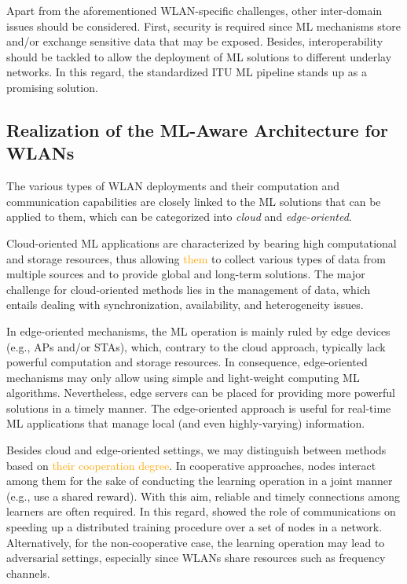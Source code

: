 \documentclass[journal]{IEEEtran}
\begin{document}
Apart from the aforementioned WLAN-specific challenges, other inter-domain issues should be considered. First, security is required since ML mechanisms store and/or exchange sensitive data that may be exposed. Besides, interoperability should be tackled to allow the deployment of ML solutions to different underlay networks. In this regard, the standardized ITU ML pipeline stands up as a promising solution.

\subsection{Realization of the ML-Aware Architecture for WLANs}
The various types of WLAN deployments and their computation and communication capabilities are closely linked to the ML solutions that can be applied to them, which can be categorized into \emph{cloud} and \emph{edge-oriented}. 

Cloud-oriented ML applications are characterized by
bearing high computational and storage resources, thus allowing \textcolor{orange}{them} to collect various types of data from multiple sources and to provide global and long-term solutions. The major challenge for cloud-oriented methods lies in the management of data, which entails dealing with synchronization, availability, and heterogeneity issues.

In edge-oriented mechanisms, the ML operation is mainly ruled by edge devices (e.g., APs and/or STAs), which, contrary to the cloud approach, typically lack powerful computation and storage resources. In consequence, edge-oriented mechanisms may only allow using simple and light-weight computing ML algorithms. Nevertheless, edge servers can be placed for providing more powerful solutions in a timely manner. The edge-oriented approach is useful for real-time ML applications that manage local (and even highly-varying) information.

Besides cloud and edge-oriented settings, we may distinguish between methods based on \textcolor{orange}{their cooperation degree}. In cooperative approaches, nodes interact among them for the sake of conducting the learning operation in a joint manner (e.g., use a shared reward). With this aim, reliable and timely connections among learners are often required. In this regard, \cite{lin2017deep} showed the role of communications on speeding up a distributed training procedure over a set of nodes in a network. Alternatively, for the non-cooperative case, the learning operation may lead to adversarial settings, especially since WLANs share resources such as frequency channels.
\end{document}
